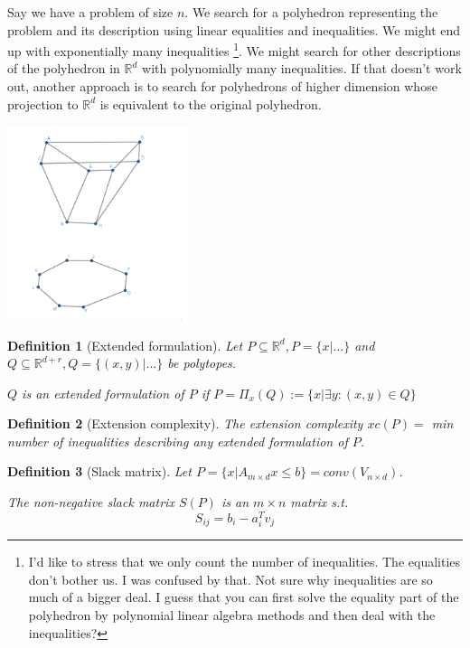 \documentclass{article}
\newtheorem*{definition}{Definition}
\newcommand{\R}{\mathbb{R}}
\begin{document}
Say we have a problem of size $n$. We search for a polyhedron representing the
problem and its description using linear equalities and inequalities. We might
end up with exponentially many inequalities \footnote{I'd like to stress that
we only count the number of inequalities. The equalities don't bother us. I was
confused by that. Not sure why inequalities are so much of a bigger deal. I
guess that you can first solve the equality part of the polyhedron by
polynomial linear algebra methods and then deal with the inequalities?}. We
might search for other descriptions of the polyhedron in $\R^d$ with
polynomially many inequalities. If that doesn't work out, another approach is
to search for polyhedrons of higher dimension whose projection to $\R^d$ is
equivalent to the original polyhedron.


\includegraphics[width=200px]{extended-formulation.png}

\begin{definition}[Extended formulation]
	Let $P \subseteq \R^d, P = \{x | \hdots\}$ and $Q \subseteq \R^{d + r},
	Q = \{(x, y) | \hdots\}$ be polytopes.

	$Q$ is an extended formulation of $P$ if $P = \Pi_x(Q) := \{ x |
	\exists y: (x, y) \in Q\}$
\end{definition}

\begin{definition}[Extension complexity]
	The \emph{extension complexity} $xc(P) =$ min number of inequalities
	describing any extended formulation of $P$.
\end{definition}

\begin{definition}[Slack matrix]
	Let $P = \{x|A_{m \times d}x \le b\} = conv(V_{n \times d})$.

	The non-negative \emph{slack matrix} $S(P)$ is an $m \times n$ matrix
	s.t.
	$$
	S_{ij} = b_i - a_i^Tv_j
	$$
\end{definition}
\end{document}
